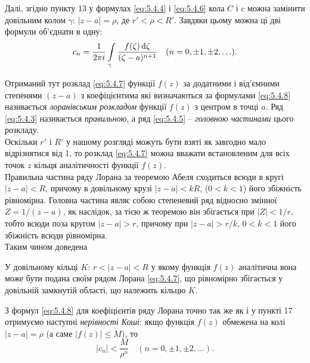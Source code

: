 Далі, згідно пункту 13 у формулах \eqref{eq:5.4.4} і \eqref{eq:5.4.6} кола $C$ і $c$ можна замінити довільним колом $\gamma$: $|z - a| = \rho$, де $r' < \rho < R'$. Завдяки цьому можна ці дві формули об'єднати в одну:
\begin{equation}
	\label{eq:5.4.8}
	c_n = \frac{1}{2 \pi i} \displaystyle\int\limits_\gamma \frac{f(\zeta) \mathop{}\!\mathrm{d} \zeta}{(\zeta - a)^{n + 1}} \quad (n = 0, \pm 1, \pm 2, \ldots).
\end{equation}

Отриманий тут розклад \eqref{eq:5.4.7} функції $f(z)$ за додатними і від'ємними степенями $(z - a)$ з коефіцієнтима які визначаються за формулами \eqref{eq:5.4.8} називається \textit{лоранівським розкладом} функції $f(z)$ з центром в точці $a$. Ряд \eqref{eq:5.4.3} називається \textit{правильною}, а ряд \eqref{eq:5.4.5} -- \textit{головною частинами} цього розкладу. \\

Оскільки $r'$ і $R'$ у нашому розгляді можуть бути взяті як завгодно мало відрізнятися від 1, то розклад \eqref{eq:5.4.7} можна вважати встановленим для всіх точок $z$ кільця аналітичності функції $f(z)$. \\

Правильна частина ряду Лорана за теоремою Абеля сходиться всюди в кругі $|z - a| < R$, причому в довільному крузі $|z - a| < k R$, ($0 < k < 1$) його збіжність рівномірна. Головна частина являє собою степеневий ряд відносно змінної $Z = 1 / (z - a)$, як наслідок, за тією ж теоремою він збігається при $|Z| < 1 / r$, тобто всюди поза кругом $|z - a| > r$, причому при $|z - a| > r / k$, $0 < k < 1$ його збіжність всюди рівномірна. \\

Таким чином доведена

\begin{theorem}[П. Лоран, 1843 р.]
	У довільному кільці $K$: $r < |z - a| < R$ у якому функція $f(z)$ аналітична вона може бути подана своїм рядом Лорана \eqref{eq:5.4.7}, що рівномірно збігається у довільній замкнутій області, що належить кільцю $K$.
\end{theorem}


З формул \eqref{eq:5.4.8} для коефіцієнтів ряду Лорана точно так же як і у пункті 17 отримуємо наступні \textit{нерівності Коші}: якщо функція $f(z)$ обмежена на колі $|z - a| = \rho$ (а саме $|f(z)| \le M$), то
\begin{equation}
	\label{eq:5.4.9}
	|c_n| < \frac{M}{\rho^n} \quad (n = 0, \pm 1, \pm 2, \ldots).
\end{equation}

